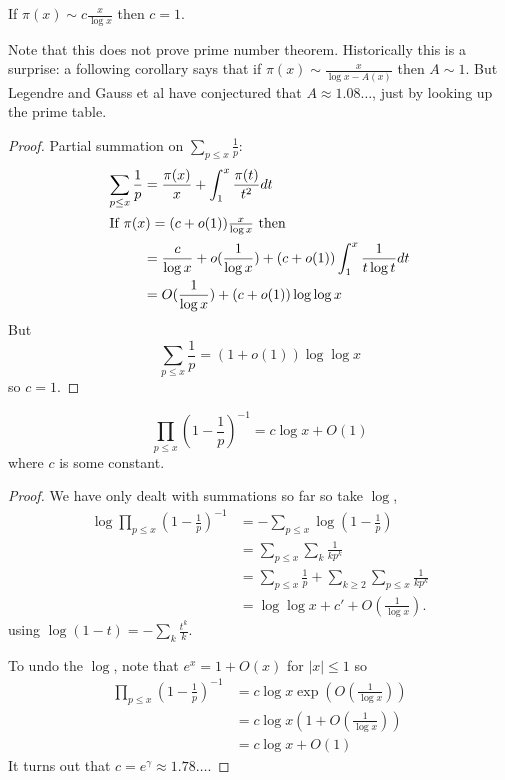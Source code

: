 \documentclass[a4paper]{article}
\begin{document}
\begin{theorem}[Chebyshev]
  If \(\pi(x) \sim c \frac{x}{\log x}\) then \(c = 1\).
\end{theorem}

Note that this does not prove prime number theorem. Historically this is a surprise: a following corollary says that if \(\pi(x) \sim \frac{x}{\log x - A(x)}\) then \(A \sim 1\). But Legendre and Gauss et al have conjectured that \(A \approx 1.08 \dots\), just by looking up the prime table.

\begin{proof}
  Partial summation on \(\sum_{p \leq x} \frac{1}{p}\):
  \begin{align*}
    \sum_{p \leq x} \frac{1}{p}
    &= \frac{\pi(x)}{x} + \int_1^x \frac{\pi(t)}{t^2} dt \\
    \intertext{If \(\pi(x) = (c + o(1)) \frac{x}{\log x}\) then}
    &= \frac{c}{\log x} + o(\frac{1}{\log x}) + (c + o(1)) \int_1^x \frac{1}{t \log t} dt \\
    &= O(\frac{1}{\log x}) + (c + o(1)) \log \log x
  \end{align*}
  But
  \[
    \sum_{p \leq x} \frac{1}{p} = (1 + o(1)) \log \log x
  \]
  so \(c = 1\).
\end{proof}

\begin{lemma}
  \[
    \prod_{p \leq x} \left( 1 - \frac{1}{p} \right)^{-1} = c\log x + O(1)
  \]
  where \(c\) is some constant.
\end{lemma}

\begin{proof}
  We have only dealt with summations so far so take \(\log\),
  \begin{align*}
    \log \prod_{p \leq x} \left( 1 - \frac{1}{p} \right)^{-1}
    &= - \sum_{p \leq x} \log (1 - \frac{1}{p}) \\
    &= \sum_{p \leq x} \sum_k \frac{1}{k p^k} \\
    &= \sum_{p \leq x} \frac{1}{p} + \sum_{k \geq 2} \sum_{p \leq x} \frac{1}{kp^k} \\
    &= \log \log x + c' + O(\frac{1}{\log x}).
  \end{align*}
  using \(\log (1 - t) = - \sum_k \frac{t^k}{k}\).

  To undo the \(\log\), note that \(e^x = 1 + O(x)\) for \(|x| \leq 1\) so
  \begin{align*}
    \prod_{p \leq x} \left( 1 - \frac{1}{p} \right)^{-1}
    &= c \log x \exp (O(\frac{1}{\log x})) \\
    &= c \log x (1 + O(\frac{1}{\log x})) \\
    &= c \log x + O(1)
  \end{align*}
  It turns out that \(c = e^\gamma \approx 1.78 \dots\).
\end{proof}
\end{document}
